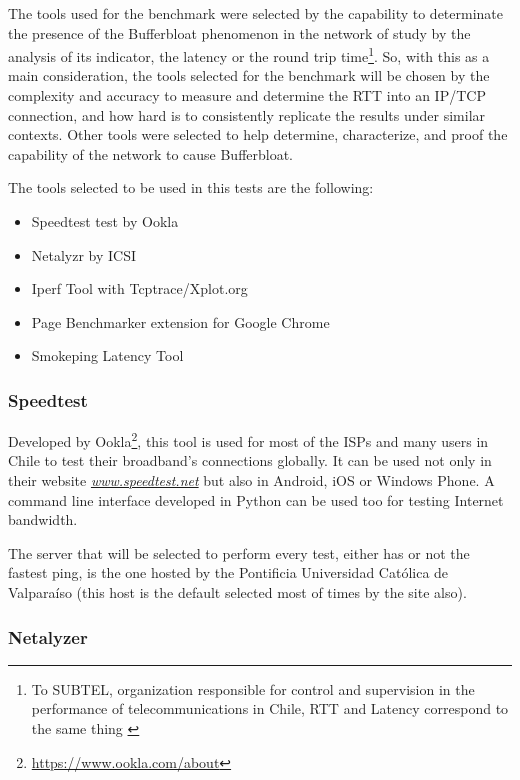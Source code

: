 The tools used for the benchmark were selected by the capability to
determinate  the presence of the Bufferbloat phenomenon in the network of
study by the  analysis of its indicator, the latency or the round trip
time\footnote{To  SUBTEL, organization responsible for control and supervision
in the performance  of telecommunications in Chile, RTT and Latency correspond
to the same thing  \cite{subtel} }. So, with this as a main consideration, the
tools selected for  the benchmark will be chosen by the complexity and
accuracy to measure and  determine the RTT into an IP/TCP connection, and how
hard is to consistently  replicate the results under similar contexts. Other
tools were selected to help  determine, characterize, and proof the capability
of the network to cause  Bufferbloat.

\newpage 

The tools selected to be used in this tests are the following:

\begin{itemize}
    \item Speedtest test by Ookla
    \item Netalyzr by ICSI
    \item Iperf Tool with Tcptrace/Xplot.org
    \item Page Benchmarker extension for Google Chrome
    \item Smokeping Latency Tool
\end{itemize}

\subsubsection{Speedtest}

Developed by Ookla\footnote{\url{https://www.ookla.com/about}}, this tool is used
for most of the ISPs and many users in Chile to test their broadband's
connections globally. It can be used not only in their website 
\href{http://www.speedtest.net}{\textit{www.speedtest.net}} but also in Android,
iOS or Windows Phone. A command line interface developed in Python can be used 
too for testing Internet bandwidth.

The server that will be selected to perform every test, either has or not the
fastest ping, is the one hosted by the Pontificia Universidad Cat\'olica de
Valpara\'iso (this host is the default selected most of times by the site also).  

\subsubsection{Netalyzer}

